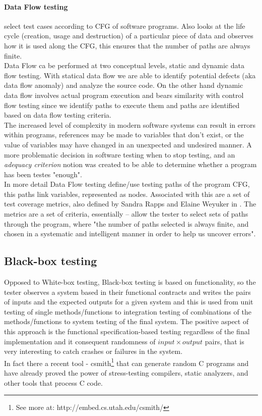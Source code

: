 \documentclass[citeauthoryear]{llncs}
\begin{document}
\paragraph{Data Flow testing} select test cases according to CFG of software programs. Also looks at the life cycle (creation, usage and destruction)
of a particular piece of data and observes how it is used along the CFG, this ensures that the number of paths are always finite\cite{dataflow}.\\
Data Flow ca be performed at two conceptual levels, static and dynamic data flow testing. With statical data flow we are able to identify potential
defects (aka data flow anomaly) and analyze the source code. On the other hand dynamic data flow involves actual program execution and bears similarity with control flow testing
since we identify paths to execute them and paths are identified based on data flow testing criteria.\\
The increased level of complexity in modern software systems can result in errors within programs, references may be made to variables that don't exist,
or the value of variables may have changed in an unexpected and undesired manner. A more problematic decision in software testing when to stop testing,
and an \textit{adequacy criterion}\cite{Frankl:1988:AFD:53064.53075} notion was created to be able to determine whether a program has been testes "enough".\\
In more detail Data Flow testing define/use testing paths of the program CFG, this paths link variables, represented as nodes\cite{dataflow}.
Associated with this are a set of test coverage metrics, also defined by Sandra Rapps and Elaine Weyuker in \cite{dataflow}.
The metrics are a set of criteria, essentially – allow the tester to select sets of paths through the program, where "the number of paths selected
is always finite, and chosen in a systematic and intelligent manner in order to
help us uncover errors".

\subsection{Black-box testing}
Opposed to White-box testing, Black-box testing is based on functionality, so the tester observes a system based in their functional contracts and writes the
pairs of inputs and the expected outputs for a given system and this is used from unit testing of single methods/functions to integration testing
of combinations of the methods/functions to system testing of the final system. The positive aspect of this approach is the functional specification-based testing
regardless of the final implementation and it consequent randomness of $input \times output$ pairs, that is very interesting to catch crashes or failures in the system.\\
In fact there a recent tool - csmith\footnote{See more at: http://embed.cs.utah.edu/csmith/} that can generate random C programs and have already proved
the power of stress-testing compilers, static analyzers, and other tools that process C code\cite{Yang:2011:FUB:1993316.1993532}.\\
\end{document}
